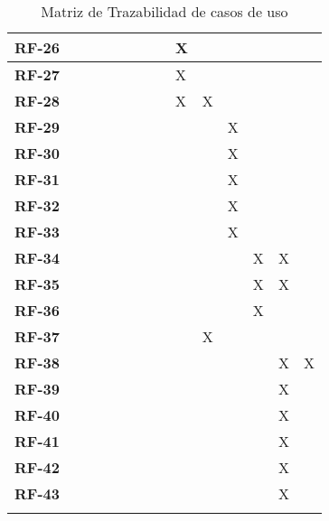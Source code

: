 \begin{center}
\begin{longtable}{ c | p{0.75cm} p{0.75cm} p{0.75cm} p{0.75cm} p{0.75cm} p{0.75cm} p{0.75cm} p{0.75cm} p{0.75cm} p{0.75cm} p{0.75cm} p{0.75cm} p{0.75cm} |}
	\textbf{RF-26} &  &  &  &  &  &  &  & X &  &  &  &  &  \\ \hline
	\textbf{RF-27} &  &  &  &  &  &  &  & X &  &  &  &  &  \\ \hline
	\textbf{RF-28} &  &  &  &  &  &  &  & X & X &  &  &  &  \\ \hline
	\textbf{RF-29} &  &  &  &  &  &  &  &  &  & X &  &  &  \\ \hline
	\textbf{RF-30} &  &  &  &  &  &  &  &  &  & X &  &  &  \\ \hline
	\textbf{RF-31} &  &  &  &  &  &  &  &  &  & X &  &  &  \\ \hline
	\textbf{RF-32} &  &  &  &  &  &  &  &  &  & X &  &  &  \\ \hline
	\textbf{RF-33} &  &  &  &  &  &  &  &  &  & X &  &  &  \\ \hline
	\textbf{RF-34} &  &  &  &  &  &  &  &  &  &  & X & X &  \\ \hline
	\textbf{RF-35} &  &  &  &  &  &  &  &  &  &  & X & X &  \\ \hline
	\textbf{RF-36} &  &  &  &  &  &  &  &  &  &  & X &  &  \\ \hline
	\textbf{RF-37} &  &  &  &  &  &  &  &  & X &  &  &  &  \\ \hline
	\textbf{RF-38} &  &  &  &  &  &  &  &  &  &  &  & X & X \\ \hline
	\textbf{RF-39} &  &  &  &  &  &  &  &  &  &  &  & X &  \\ \hline
	\textbf{RF-40} &  &  &  &  &  &  &  &  &  &  &  & X &  \\ \hline
	\textbf{RF-41} &  &  &  &  &  &  &  &  &  &  &  & X &  \\ \hline
	\textbf{RF-42} &  &  &  &  &  &  &  &  &  &  &  & X &  \\ \hline
	\textbf{RF-43} &  &  &  &  &  &  &  &  &  &  &  & X &  \\ \hline

\caption{Matriz de Trazabilidad de casos de uso}
\label{tab:matriztraz}
\end{longtable}
\end{center}
